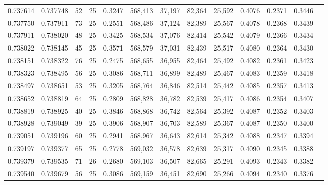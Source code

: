 \begin{tabular}{rrrrrrrrrrrrr}
0.737614 & 0.737748 &    52 &  25 &                                     0.3247 & 568,413 &  37,197 &  82,364 &  25,592 & 0.4076 & 0.2371 & 0.3446 \\
0.737750 & 0.737911 &    73 &  25 &                                     0.2551 & 568,486 &  37,124 &  82,389 &  25,567 & 0.4078 & 0.2368 & 0.3439 \\
0.737911 & 0.738020 &    48 &  25 &                                     0.3425 & 568,534 &  37,076 &  82,414 &  25,542 & 0.4079 & 0.2366 & 0.3434 \\
0.738022 & 0.738145 &    45 &  25 &                                     0.3571 & 568,579 &  37,031 &  82,439 &  25,517 & 0.4080 & 0.2364 & 0.3430 \\
0.738151 & 0.738322 &    76 &  25 &                                     0.2475 & 568,655 &  36,955 &  82,464 &  25,492 & 0.4082 & 0.2361 & 0.3423 \\
0.738323 & 0.738495 &    56 &  25 &                                     0.3086 & 568,711 &  36,899 &  82,489 &  25,467 & 0.4083 & 0.2359 & 0.3418 \\
0.738497 & 0.738651 &    53 &  25 &                                     0.3205 & 568,764 &  36,846 &  82,514 &  25,442 & 0.4085 & 0.2357 & 0.3413 \\
0.738652 & 0.738819 &    64 &  25 &                                     0.2809 & 568,828 &  36,782 &  82,539 &  25,417 & 0.4086 & 0.2354 & 0.3407 \\
0.738819 & 0.738925 &    40 &  25 &                                     0.3846 & 568,868 &  36,742 &  82,564 &  25,392 & 0.4087 & 0.2352 & 0.3403 \\
0.738928 & 0.739049 &    39 &  25 &                                     0.3906 & 568,907 &  36,703 &  82,589 &  25,367 & 0.4087 & 0.2350 & 0.3400 \\
0.739051 & 0.739196 &    60 &  25 &                                     0.2941 & 568,967 &  36,643 &  82,614 &  25,342 & 0.4088 & 0.2347 & 0.3394 \\
0.739197 & 0.739377 &    65 &  25 &                                     0.2778 & 569,032 &  36,578 &  82,639 &  25,317 & 0.4090 & 0.2345 & 0.3388 \\
0.739379 & 0.739535 &    71 &  26 &                                     0.2680 & 569,103 &  36,507 &  82,665 &  25,291 & 0.4093 & 0.2343 & 0.3382 \\
0.739540 & 0.739679 &    56 &  25 &                                     0.3086 & 569,159 &  36,451 &  82,690 &  25,266 & 0.4094 & 0.2340 & 0.3376 \\

\end{tabular}
